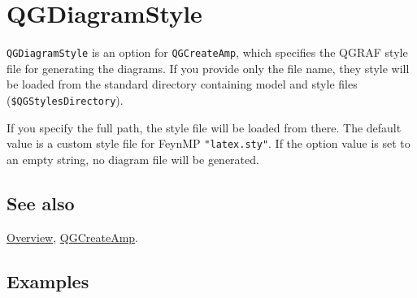 \documentclass[../FeynHelpersManual.tex]{subfiles}
\begin{document}
\hypertarget{qgdiagramstyle}{
\section{QGDiagramStyle}\label{qgdiagramstyle}}

\texttt{QGDiagramStyle} is an option for \texttt{QGCreateAmp}, which
specifies the QGRAF style file for generating the diagrams. If you
provide only the file name, they style will be loaded from the standard
directory containing model and style files
(\texttt{\$QGStylesDirectory}).

If you specify the full path, the style file will be loaded from there.
The default value is a custom style file for FeynMP
\texttt{"latex.sty"}. If the option value is set to an empty string, no
diagram file will be generated.

\subsection{See also}

\hyperlink{toc}{Overview}, \hyperlink{qgcreateamp}{QGCreateAmp}.

\subsection{Examples}
\end{document}
